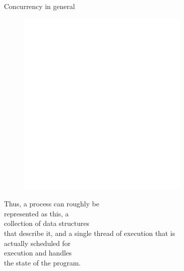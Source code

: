 \documentclass[usenames,dvipsnames,10pt,aspectratio=169]{beamer}
\begin{document}
\begin{frame}{Concurrency in general}
	\large
\begin{figure}
\centering
\includegraphics[width=0.7\linewidth]{graphics/process1.png}
\end{figure}
	Thus, a process can roughly be\\
	represented as this, a\\
	collection of data structures\\
	that describe it,
	and a single thread of execution that is\\
	actually scheduled for\\
	execution and handles\\
	the state of the program.
\vspace{2.8cm}
\end{frame}
\end{document}
